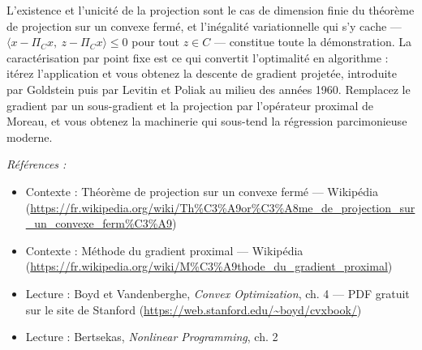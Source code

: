 \documentclass[11pt]{article}
\newenvironment{refs}{\par\small\noindent\emph{Références :}\begin{itemize}\setlength\itemsep{0pt}}{\end{itemize}\normalsize}
\begin{document}
\noindent L'existence et l'unicité de la projection sont le cas de dimension finie du
théorème de projection sur un convexe fermé, et l'inégalité variationnelle qui s'y cache ---
$\langle x - \Pi_C x,\ z - \Pi_C x \rangle \le 0$ pour tout $z \in C$ --- constitue toute la
démonstration. La caractérisation par point fixe est ce qui convertit l'optimalité en algorithme :
itérez l'application et vous obtenez la descente de gradient projetée, introduite par Goldstein
puis par Levitin et Poliak au milieu des années 1960. Remplacez le gradient par un sous-gradient et
la projection par l'opérateur proximal de Moreau, et vous obtenez la machinerie qui sous-tend la
régression parcimonieuse moderne.

\begin{refs}
\item Contexte : Théorème de projection sur un convexe fermé --- Wikipédia (\url{https://fr.wikipedia.org/wiki/Th%C3%A9or%C3%A8me_de_projection_sur_un_convexe_ferm%C3%A9})
\item Contexte : Méthode du gradient proximal --- Wikipédia (\url{https://fr.wikipedia.org/wiki/M%C3%A9thode_du_gradient_proximal})
\item Lecture : Boyd et Vandenberghe, \textit{Convex Optimization}, ch. 4 --- PDF gratuit sur le site de Stanford (\url{https://web.stanford.edu/~boyd/cvxbook/})
\item Lecture : Bertsekas, \textit{Nonlinear Programming}, ch. 2
\end{refs}

\bigskip
\end{document}

